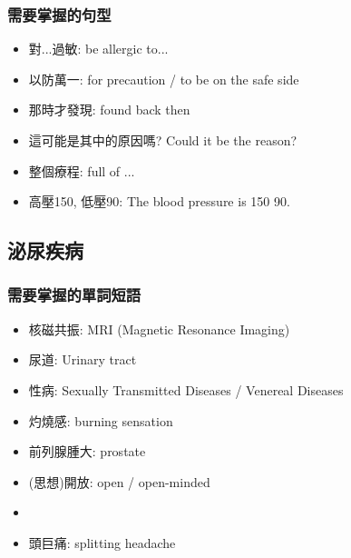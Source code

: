 \subsubsection*{需要掌握的句型}
\begin{itemize}
  \itemsep0em
  \item 對...過敏: be allergic to...
  \item 以防萬一: for precaution / to be on the safe side
  \item 那時才發現: found back then
  \item 這可能是其中的原因嗎? Could it be the reason?
  \item 整個療程: full  of ...
  \item 高壓150, 低壓90: The blood pressure is 150  90.
\end{itemize}

\subsection{泌尿疾病}
\subsubsection*{需要掌握的單詞短語}
\begin{itemize}
  \itemsep0em
  \item 核磁共振: MRI (Magnetic Resonance Imaging)
  \item 尿道: Urinary tract
  \item 性病: Sexually Transmitted Diseases / Venereal Diseases
  \item 灼燒感: burning sensation
  \item 前列腺腫大:  prostate
  \item (思想)開放: open / open-minded
  \item {}
  \item 頭巨痛: splitting headache
\end{itemize}

